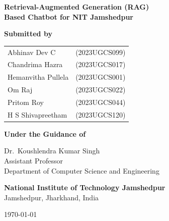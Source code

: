 % 

\begin{titlepage}
    \begin{center}
        \vspace*{1cm}
        
        {\huge \bfseries Retrieval-Augmented Generation (RAG)\\[0.3cm]
        Based Chatbot for NIT Jamshedpur}
        
        \vspace{2cm}
        
        {\Large \textbf{Submitted by}}
        
        \vspace{0.5cm}
        
        \begin{tabular}{ll}
            {\large Abhinav Dev C} & {\large (2023UGCS099)}\\[0.3cm]
            {\large Chandrima Hazra} & {\large (2023UGCS017)}\\[0.3cm]
            {\large Hemanvitha Pullela} & {\large (2023UGCS001)}\\[0.3cm]
            {\large Om Raj} & {\large (2023UGCS022)}\\[0.3cm]
            {\large Pritom Roy} & {\large (2023UGCS044)}\\[0.3cm]
            {\large H S Shivapreetham} & {\large (2023UGCS120)}
        \end{tabular}
        
        \vfill
        
        {\Large \textbf{Under the Guidance of}}
        
        \vspace{0.5cm}
        
        {\large Dr.\ Koushlendra Kumar Singh}\\[0.2cm]
        {\normalsize Assistant Professor}\\
        {\normalsize Department of Computer Science and Engineering}
        
        \vfill
        
        
        \vspace{0.5cm}
        
        {\Large \textbf{National Institute of Technology Jamshedpur}}\\[0.3cm]
        {\normalsize Jamshedpur, Jharkhand, India}
        
        \vspace{1cm}
        
        {\large \today}
        
        \vspace{1cm}
    \end{center}
\end{titlepage}
